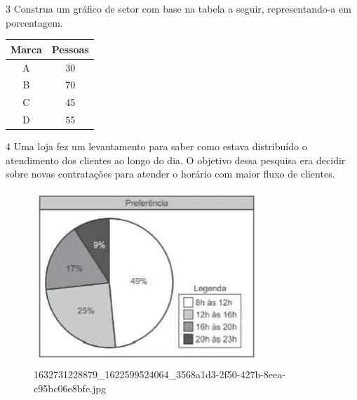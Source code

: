 {{{\begin{escolha}
{{{{{\begin{escolha}
\begin{escolha}
{\begin{q°}
\num{3} Construa um gráfico de setor com base na tabela a seguir,
representando-a em porcentagem.

\begin{table}[]
\begin{tabular}{|c|c|}
\hline
\rowcolor[HTML]{DAE8FC} 
\textbf{Marca} & \textbf{Pessoas} \\ \hline
A & 30 \\ \hline
B & 70 \\ \hline
C & 45 \\ \hline
D & 55 \\ \hline
\end{tabular}
\end{table}




\num{4} Uma loja fez um levantamento para saber como estava distribuído o
atendimento dos clientes ao longo do dia. O objetivo dessa pesquisa era decidir
sobre novas contratações para atender o horário com maior fluxo de clientes.

\begin{figure}
\centering
\includegraphics[width=3.32598in,height=2.58268in]{./_SAEB_9_MAT/media/image214.jpg}
\caption{1632731228879\_1622599524064\_3568a1d3-2f50-427b-8eea-c95bc06e8bfe.jpg}
\end{figure}


\end{q°}}
\end{escolha}
\end{escolha}}}}}}
\end{escolha}}}}
